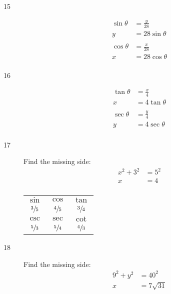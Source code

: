 \documentclass{exam}
\begin{document}
\begin{description}
      \item[15]
        \begin{align*}
          \sin \theta & = \frac{y}{28} \\
          y           & = \boxed{ 28 \sin \theta } \\
          \\
          \cos \theta & = \frac{x}{28} \\
          x           & = \boxed{ 28 \cos \theta } \\
        \end{align*}

      \item[16]
        \begin{align*}
          \tan \theta & = \frac{x}{4} \\
          x           & = \boxed{ 4 \tan \theta } \\
          \\
          \sec \theta & = \frac{y}{4} \\
          y           & = \boxed{ 4 \sec \theta } \\
        \end{align*}

      \item[17] 
        Find the missing side:
        \begin{align*}
          x^2 + 3^2 & = 5^2 \\
          x         & = 4 \\
        \end{align*}

        \begin{tabular}[H]{ccc}
          \toprule

          $\sin$         & $\cos$         & $\tan$         \\
          $\sfrac{3}{5}$ & $\sfrac{4}{5}$ & $\sfrac{3}{4}$ \\

          \midrule

          $\csc$         & $\sec$         & $\cot$ \\
          $\sfrac{5}{3}$ & $\sfrac{5}{4}$ & $\sfrac{4}{3}$ \\

          \bottomrule
        \end{tabular}

      \item[18] 
        Find the missing side:
        \begin{align*}
          9^2 + y^2 & = 40^2 \\
          x         & = 7 \sqrt{31} \\
        \end{align*}


\end{description}
\end{document}

